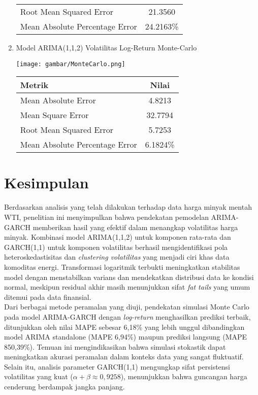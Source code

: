 \documentclass[a4paper,12pt]{article}
\begin{document}
\begin{enumerate}[label=(\alph*)]
\begin{table}[H]
\begin{tabular}{l c}
        Root Mean Squared Error & 21.3560  \\
        Mean Absolute Percentage Error & 24.2163\%  \\
        \bottomrule
        \end{tabular}
    \end{table}
    \vspace{0.3cm}
    \item Model ARIMA(1,1,2) Volatilitas Log-Return Monte-Carlo
    \begin{table}[H]
        \centering
        \texttt{[image: gambar/MonteCarlo.png]}
        \begin{tabular}{l c}
        \toprule
        \textbf{Metrik} & \textbf{Nilai}  \\
        \midrule
        Mean Absolute Error & 4.8213  \\
        Mean Square Error & 32.7794  \\
        Root Mean Squared Error & 5.7253  \\
        Mean Absolute Percentage Error & 6.1824\%  \\
        \bottomrule
        \end{tabular}
    \end{table}
\end{enumerate}




\section{Kesimpulan}

Berdasarkan analisis yang telah dilakukan terhadap data harga minyak mentah WTI, penelitian ini menyimpulkan bahwa pendekatan pemodelan ARIMA-GARCH memberikan hasil yang efektif dalam menangkap volatilitas harga minyak. Kombinasi model ARIMA(1,1,2) untuk komponen rata-rata dan GARCH(1,1) untuk komponen volatilitas berhasil mengidentifikasi pola heteroskedastisitas dan \textit{clustering volatilitas} yang menjadi ciri khas data komoditas energi. Transformasi logaritmik terbukti meningkatkan stabilitas model dengan menstabilkan varians dan mendekatkan distribusi data ke kondisi normal, meskipun residual akhir masih menunjukkan sifat \textit{fat tails} yang umum ditemui pada data finansial. \\


Dari berbagai metode peramalan yang diuji, pendekatan simulasi Monte Carlo pada model ARIMA-GARCH dengan \textit{log-return} menghasilkan prediksi terbaik, ditunjukkan oleh nilai MAPE sebesar 6,18\% yang lebih unggul dibandingkan model ARIMA standalone (MAPE 6,94\%) maupun prediksi langsung (MAPE 850,39\%). Temuan ini mengindikasikan bahwa simulasi stokastik dapat meningkatkan akurasi peramalan dalam konteks data yang sangat fluktuatif. Selain itu, analisis parameter GARCH(1,1) mengungkap sifat persistensi volatilitas yang kuat ($\alpha + \beta \approx 0,9258$), menunjukkan bahwa guncangan harga cenderung berdampak jangka panjang. \\
\end{document}
